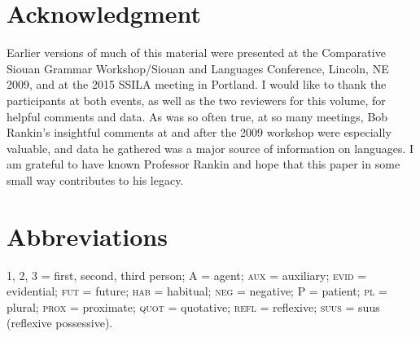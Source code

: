 \documentclass[output=paper]{LSP/langsci}
\begin{document}
\section*{Acknowledgment}

Earlier versions of much of this material were presented at the Comparative Siouan Grammar Workshop/Siouan and  Languages Conference, Lincoln, NE 2009, and at the 2015 SSILA meeting in Portland. I would like to thank the participants at both events, as well as the two reviewers for this volume, for helpful comments and data. As was so often true, at so many meetings, Bob Rankin's insightful comments at and after the 2009 workshop were especially valuable, and data he gathered was a major source of information on  languages. I am grateful to have known Professor Rankin and hope that this paper in some small way contributes to his legacy.

\section*{Abbreviations}

1, 2, 3 = first, second, third person; A = agent; \textsc{aux} = auxiliary; \textsc{evid} = evidential; \textsc{fut} = future; \textsc{hab} = habitual; \textsc{neg} = negative; P = patient; \textsc{pl} = plural; \textsc{prox} = proximate; \textsc{quot} = quotative; \textsc{refl} = reflexive; \textsc{suus} = suus (reflexive possessive). 


\printbibliography[heading=subbibliography,notkeyword=this]

\begin{reflist}
   
\end{reflist}
\end{document}
